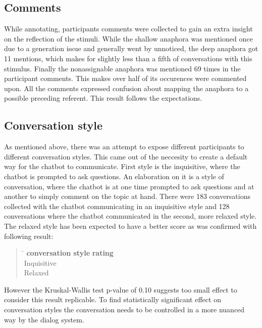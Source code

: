 \subsection{Comments}

While annotating, participants comments were collected
to gain an extra insight on the reflection of the stimuli.
While the shallow anaphora was mentioned once due to a generation issue
and generally went by unnoticed,
the deep anaphora got 11 mentions, which makes for
slightly less than a fifth of conversations with this stimulus.
Finally the nonassignable anaphora was mentioned 69 times in the participant comments.
This makes over half of its occurences were commented upon.
All the comments expressed confusion about mapping the anaphora to a possible preceding referent.
This result follows the expectations.

\subsection{Conversation style}

As mentioned above, there was an attempt
to expose different participants to different conversation styles.
This came out of the neccesity to create a default way for the chatbot to communicate.
First style is the inquisitive, where the chatbot is prompted to ask questions.
An elaboration on it is a style of conversation,
where the chatbot is at one time prompted to ask questions and
at another to simply comment on the topic at hand.
There were 183 conversations collected with the chatbot communicating in an inquisitive style
and 128 conversations where the chatbot communicated in the second, more relaxed style.
The relaxed style has been expected to have a better score as was confirmed
with following result:

\begin{quote}
\begin{tabbing}
\hspace{4cm} \= \hspace{3cm} \kill %
\textbf{conversation style} \> \textbf{rating} \\
Inquisitive \\
Relaxed  \\
\end{tabbing}
\end{quote}

However the Kruskal-Wallis test p-value of 0.10 suggests too small effect
to consider this result replicable.
To find statistically significant effect on conversation styles
the conversation needs to be controlled in a more nuanced way by the dialog system.

